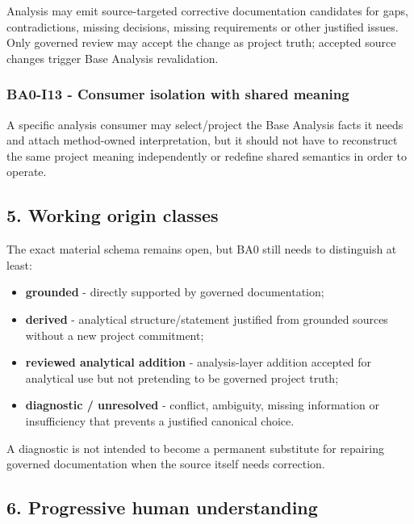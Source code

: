 \documentclass[
  10pt,
  a4paper,
]{article}
\providecommand{\tightlist}{%
  \setlength{\itemsep}{0pt}\setlength{\parskip}{0pt}}
\begin{document}
Analysis may emit source-targeted corrective documentation candidates
for gaps, contradictions, missing decisions, missing requirements or
other justified issues. Only governed review may accept the change as
project truth; accepted source changes trigger Base Analysis
revalidation.

\subsubsection{BA0-I13 - Consumer isolation with shared
meaning}\label{ba0-i13---consumer-isolation-with-shared-meaning}

A specific analysis consumer may select/project the Base Analysis facts
it needs and attach method-owned interpretation, but it should not have
to reconstruct the same project meaning independently or redefine shared
semantics in order to operate.

\subsection{5. Working origin classes}\label{5-working-origin-classes}

The exact material schema remains open, but BA0 still needs to
distinguish at least:

\begin{itemize}
\tightlist
\item
  \textbf{grounded} - directly supported by governed documentation;
\item
  \textbf{derived} - analytical structure/statement justified from
  grounded sources without a new project commitment;
\item
  \textbf{reviewed analytical addition} - analysis-layer addition
  accepted for analytical use but not pretending to be governed project
  truth;
\item
  \textbf{diagnostic / unresolved} - conflict, ambiguity, missing
  information or insufficiency that prevents a justified canonical
  choice.
\end{itemize}

A diagnostic is not intended to become a permanent substitute for
repairing governed documentation when the source itself needs
correction.

\subsection{6. Progressive human
understanding}\label{6-progressive-human-understanding}
\end{document}
